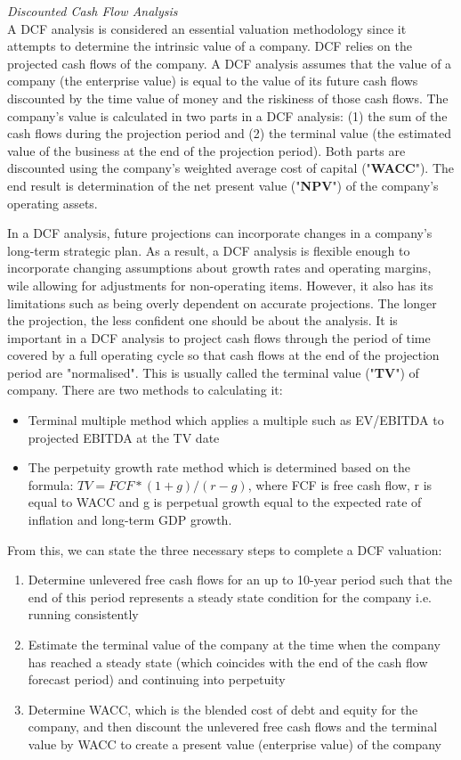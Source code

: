 \documentclass[10pt, a4paper]{article}
\begin{document}
\vspace{10pt}
\noindent \textit{Discounted Cash Flow Analysis}\\
A DCF analysis is considered an essential valuation methodology since it attempts to determine the intrinsic value of a company. DCF relies on the projected cash flows of the company. A DCF analysis assumes that the value of a company (the enterprise value) is equal to the value of its future cash flows discounted by the time value of money and the riskiness of those cash flows. The company's value is calculated in two parts in a DCF analysis: (1) the sum of the cash flows during the projection period and (2) the terminal value (the estimated value of the business at the end of the projection period). Both parts are discounted using the company's weighted average cost of capital ("\textbf{WACC}"). The end result is determination of the net present value ("\textbf{NPV}") of the company's operating assets.

\vspace{5pt}
\noindent In a DCF analysis, future projections can incorporate changes in a company's long-term strategic plan. As a result, a DCF analysis is flexible enough to incorporate changing assumptions about growth rates and operating margins, wile allowing for adjustments for non-operating items. However, it also has its limitations such as being overly dependent on accurate projections. The longer the projection, the less confident one should be about the analysis. It is important in a DCF analysis to project cash flows through the period of time covered by a full operating cycle so that cash flows at the end of the projection period are "normalised". This is usually called the terminal value ("\textbf{TV}") of company. There are two methods to calculating it:
\begin{itemize}
	\item Terminal multiple method which applies a multiple such as EV/EBITDA to projected EBITDA at the TV date
	\item The perpetuity growth rate method which is determined based on the formula: $TV = FCF * (1+g)/(r-g)$, where FCF is free cash flow, r is equal to WACC and g is perpetual growth equal to the expected rate of inflation and long-term GDP growth.
\end{itemize}
From this, we can state the three necessary steps to complete a DCF valuation:
\begin{enumerate}
	\item Determine unlevered free cash flows for an up to 10-year period such that the end of this period represents a steady state condition for the company i.e. running consistently
	\item Estimate the terminal value of the company at the time when the company has reached a steady state (which coincides with the end of the cash flow forecast period) and continuing into perpetuity
	\item Determine WACC, which is the blended cost of debt and equity for the company, and then discount the unlevered free cash flows and the terminal value by WACC to create a present value (enterprise value) of the company
\end{enumerate}
\end{document}
